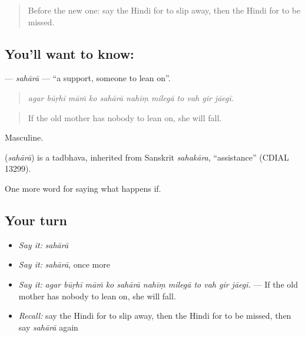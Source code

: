 \label{lesson:HI-C386-sahara}



\begin{quote}
Before the new one: say the Hindi for to slip away, then the Hindi for to be missed.
\end{quote}

\subsection*{You'll want to know: }
\textbf{} — \emph{sahārā} — \textquotedblleft{}a support, someone to lean on\textquotedblright{}.

\begin{quote}
          
\end{quote}

\begin{quote}
\emph{agar būṛhī māṁ ko sahārā nahīṃ milegā to vah gir jāegī.}
\end{quote}

\begin{quote}
If the old mother has nobody to lean on, she will fall.
\end{quote}

Masculine.

\begin{cousinweb}
\textbf{} (\emph{sahārā}) is a tadbhava, inherited from Sanskrit \emph{sahakāra}, \textquotedblleft{}assistance\textquotedblright{} (CDIAL 13299).
\end{cousinweb}

\begin{grammarlens}[title={What you've built}]
One more word for saying what happens if.
\end{grammarlens}

\subsection*{Your turn}
\begin{itemize}
\raggedright
  \item \emph{Say it:} \emph{sahārā}
  \item \emph{Say it:} \emph{sahārā}, once more
  \item \emph{Say it:} \emph{agar būṛhī māṁ ko sahārā nahīṃ milegā to vah gir jāegī.} — If the old mother has nobody to lean on, she will fall.
  \item \emph{Recall:} say the Hindi for to slip away, then the Hindi for to be missed, then say \emph{sahārā} again
\end{itemize}

